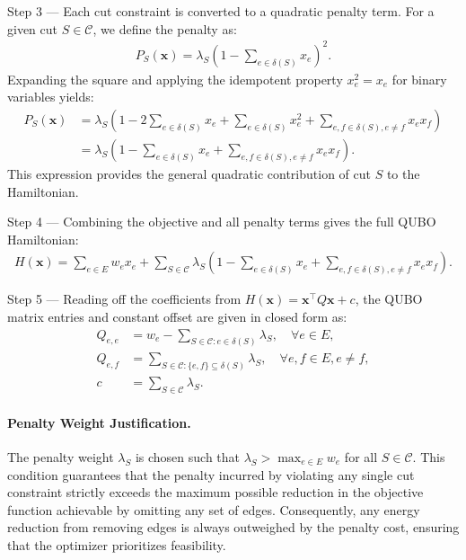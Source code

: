 \documentclass[12pt]{article}
\begin{document}
Step 3 --- Each cut constraint is converted to a quadratic penalty term. For a given cut $S \in \mathcal{C}$, we define the penalty as:
\begin{align}
P_S(\mathbf{x}) = \lambda_S \left(1 - \sum_{e \in \delta(S)} x_e\right)^2.
\end{align}
Expanding the square and applying the idempotent property $x_e^2 = x_e$ for binary variables yields:
\begin{align}
P_S(\mathbf{x}) &= \lambda_S \left(1 - 2\sum_{e \in \delta(S)} x_e + \sum_{e \in \delta(S)} x_e^2 + \sum_{e, f \in \delta(S), e \neq f} x_e x_f\right) \\
&= \lambda_S \left(1 - \sum_{e \in \delta(S)} x_e + \sum_{e, f \in \delta(S), e \neq f} x_e x_f\right).
\end{align}
This expression provides the general quadratic contribution of cut $S$ to the Hamiltonian.

Step 4 --- Combining the objective and all penalty terms gives the full QUBO Hamiltonian:
\begin{align}
H(\mathbf{x}) = \sum_{e \in E} w_e x_e + \sum_{S \in \mathcal{C}} \lambda_S \left(1 - \sum_{e \in \delta(S)} x_e + \sum_{e, f \in \delta(S), e \neq f} x_e x_f\right).
\end{align}

Step 5 --- Reading off the coefficients from $H(\mathbf{x}) = \mathbf{x}^\top Q \mathbf{x} + c$, the QUBO matrix entries and constant offset are given in closed form as:
\begin{align}
Q_{e,e} &= w_e - \sum_{S \in \mathcal{C}: e \in \delta(S)} \lambda_S, \quad \forall e \in E, \\
Q_{e,f} &= \sum_{S \in \mathcal{C}: \{e,f\} \subseteq \delta(S)} \lambda_S, \quad \forall e, f \in E, e \neq f, \\
c &= \sum_{S \in \mathcal{C}} \lambda_S.
\end{align}

\paragraph{Penalty Weight Justification.}
The penalty weight $\lambda_S$ is chosen such that $\lambda_S > \max_{e \in E} w_e$ for all $S \in \mathcal{C}$. This condition guarantees that the penalty incurred by violating any single cut constraint strictly exceeds the maximum possible reduction in the objective function achievable by omitting any set of edges. Consequently, any energy reduction from removing edges is always outweighed by the penalty cost, ensuring that the optimizer prioritizes feasibility.
\end{document}
